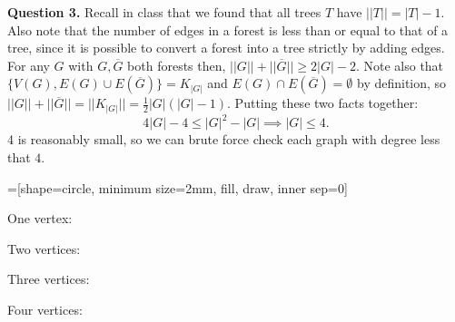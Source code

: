 \documentclass[letterpaper, reqno,11pt]{article}
\begin{document}
{\medskip\noindent\bf Question 3.} Recall in class that we found that all trees $T$ have $| |T| |=|T|-1$. Also note that the number of edges in a forest is less than or equal to that of a tree, since it is possible to convert a forest into a tree strictly by adding edges. For any $G$ with $G, \overline{G}$ both forests then, $| |G| |+| |\overline{G}| |\geq 2|G|-2$. Note also that $\{V(G), E(G)\cup E(\overline{G})\}=K_{|G|}$ and $E(G)\cap E(\overline{G})=\emptyset$ by definition, so $| |G| |+| |\overline{G}| |=| |K_{|G|}| |=\frac{1}{2}|G|(|G|-1)$. Putting these two facts together: 
\[
4|G|-4\leq |G|^2-|G|\implies |G|\leq 4
.\]
4 is reasonably small, so we can brute force check each graph with degree less that $4$. 

=[shape=circle, minimum size=2mm, fill, draw, inner sep=0]

One vertex:

\begin{center}
\end{center}

Two vertices:

\begin{center}
\end{center}

Three vertices:

\begin{center}
\end{center}

Four vertices:

\begin{center}
\end{center}
\end{document}
